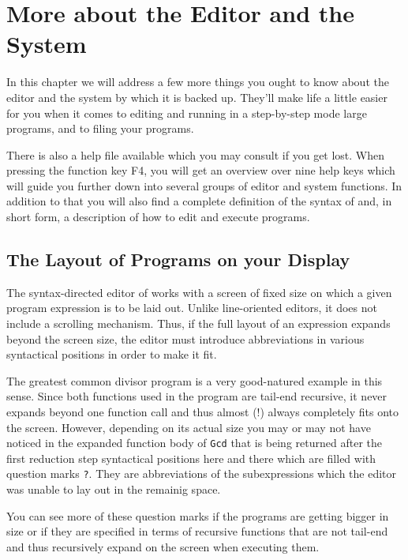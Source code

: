 \section{More about the Editor and the \pired System}

In this chapter we will address a few more things you ought to know
about the \pired editor and the system by which it is backed up. They'll 
make life a little easier
for you when it comes to editing  and running in a step-by-step mode
large programs, and to filing your programs.

There is also a {\mys help file} available which you may consult
if you get lost.
 When pressing the function key F4,
you will get an overview over nine {\mys help keys} which will guide you further down into several groups of editor and system functions. In addition to that
you will also find a complete definition of the syntax of \kir and, in short
  form, a description of how to edit and execute \kir programs.   

\subsection{The Layout of \kir Programs on your Display}

The {\mys syntax-directed editor} of \pired works with a screen of
fixed size on which a given program expression is to be laid out.
Unlike line-oriented editors, it does not include a scrolling
mechanism. Thus, if the full layout of an expression
expands beyond the screen size, the editor must introduce 
abbreviations in various syntactical positions in order to make it fit.

The greatest common divisor program is a very
good-natured example in this sense. Since
both functions used in the program are tail-end recursive, it never 
expands beyond one function call and thus almost (!) always completely
fits onto the screen. However, depending on its actual size you may or may
not have noticed in the expanded function body of {\tt Gcd} that is
being returned after the first reduction step syntactical positions
here and there which are filled with question marks {\tt ?}. They
 are {\mys abbreviations} of the subexpressions which the editor
was unable to lay out in the remainig space.

You can see more of these question marks if the programs are getting
bigger in size or if they are specified in terms of 
recursive functions that are not tail-end and thus recursively expand on 
the screen when executing them. 

